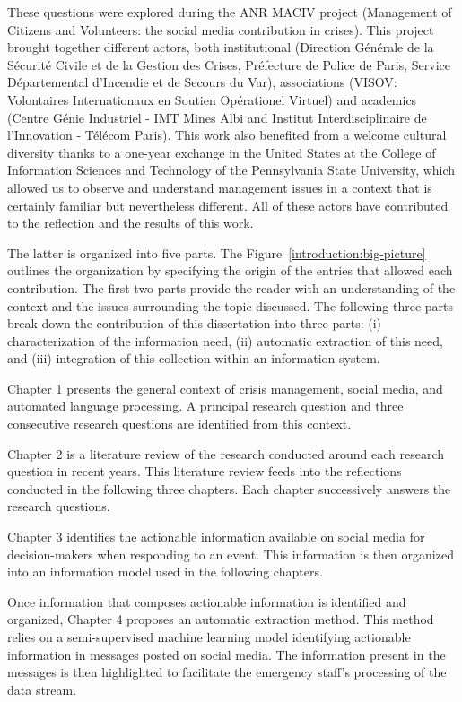 These questions were explored during the ANR MACIV project (Management of Citizens and Volunteers: the social media contribution in crises).
This project brought together different actors, both institutional (Direction Générale de la Sécurité Civile et de la Gestion des Crises, Préfecture de Police de Paris, Service Départemental d'Incendie et de Secours du Var),
associations (VISOV: Volontaires Internationaux en Soutien Opérationel Virtuel) and academics (Centre Génie Industriel - IMT Mines Albi and Institut Interdisciplinaire de l'Innovation - Télécom Paris).
This work also benefited from a welcome cultural diversity thanks to a one-year exchange in the United States at the College of Information Sciences and Technology of the Pennsylvania State University, which allowed us to observe and understand management issues in a context that is certainly familiar but nevertheless different.
All of these actors have contributed to the reflection and the results of this work.

The latter is organized into five parts.
The Figure~\ref{introduction:big-picture} outlines the organization by specifying the origin of the entries that allowed each contribution.
The first two parts provide the reader with an understanding of the context and the issues surrounding the topic discussed.
The following three parts break down the contribution of this dissertation into three parts: (i) characterization of the information need, (ii) automatic extraction of this need, and (iii) integration of this collection within an information system.

Chapter 1 presents the general context of crisis management, social media, and automated language processing.
A principal research question and three consecutive research questions are identified from this context.

Chapter 2 is a literature review of the research conducted around each research question in recent years.
This literature review feeds into the reflections conducted in the following three chapters.
Each chapter successively answers the research questions.

Chapter 3 identifies the actionable information available on social media for decision-makers when responding to an event.
This information is then organized into an information model used in the following chapters.

Once information that composes actionable information is identified and organized, Chapter 4 proposes an automatic extraction method.
This method relies on a semi-supervised machine learning model identifying actionable information in messages posted on social media.
The information present in the messages is then highlighted to facilitate the emergency staff's processing of the data stream.

